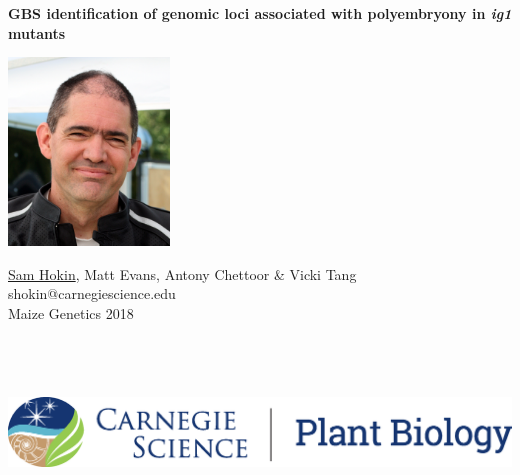 \documentclass[a0,portrait]{a0poster}
\begin{document}


\textbf{\color{CarnegiePriBlue} \Huge GBS identification of genomic loci associated with polyembryony in \textit{ig1} mutants}    %

\begin{minipage}[m]{0.06\linewidth}
  \includegraphics[height=50mm]{sam-bfr-smiling-crop.jpg} %
  \hfill
\end{minipage}
\begin{minipage}[m]{0.46\linewidth}                      %
  \raggedright
  \color{Black}
  \Large \underline{Sam Hokin}, Matt Evans, Antony Chettoor \& Vicki Tang \\
  \vspace{2mm}
  \large shokin@carnegiescience.edu \\
  \vspace{4mm}
  \Large Maize Genetics 2018
\end{minipage}
\hfill
\begin{minipage}[m]{0.48\linewidth}                      %
  \hfill
  \includegraphics[height=50mm]{CS_plantbio_logo_horz.eps} 
\end{minipage}
\end{document}
